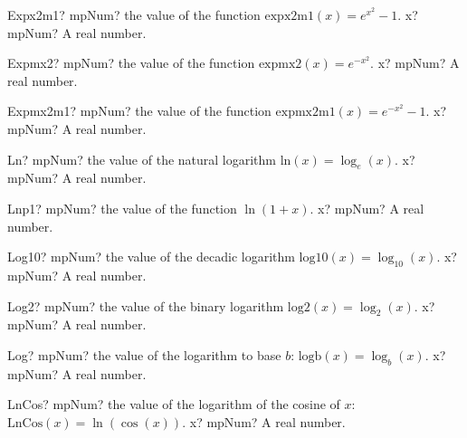 \documentclass[12pt,a4paper,openany]{book}
\begin{document}
\begin{mpFunctionsExtract}
\mpFunctionOne
{Expx2m1? mpNum? the value of the function $\text{expx2m1}(x) = e^{x^2}-1$.}
{x? mpNum? A real number.}
\end{mpFunctionsExtract}

\begin{mpFunctionsExtract}
\mpFunctionOne
{Expmx2? mpNum? the value of the function $\text{expmx2}(x) = e^{-x^2}$.}
{x? mpNum? A real number.}
\end{mpFunctionsExtract}

\begin{mpFunctionsExtract}
\mpFunctionOne
{Expmx2m1? mpNum? the value of the function $\text{expmx2m1}(x) = e^{-x^2}-1$.}
{x? mpNum? A real number.}
\end{mpFunctionsExtract}

\begin{mpFunctionsExtract}
\mpFunctionOne
{Ln? mpNum? the value of the natural logarithm $\text{ln}(x) = \log_e(x)$.}
{x? mpNum? A real number.}
\end{mpFunctionsExtract}

\begin{mpFunctionsExtract}
\mpFunctionOne
{Lnp1? mpNum? the value of the function $\ln(1+x)$.}
{x? mpNum? A real number.}
\end{mpFunctionsExtract}

\begin{mpFunctionsExtract}
\mpFunctionOne
{Log10? mpNum? the value of the decadic logarithm $\text{log10}(x) = \log_{10}(x)$.}
{x? mpNum? A real number.}
\end{mpFunctionsExtract}

\begin{mpFunctionsExtract}
\mpFunctionOne
{Log2? mpNum? the value of the binary logarithm $\text{log2}(x) = \log_{2}(x)$.}
{x? mpNum? A real number.}
\end{mpFunctionsExtract}

\begin{mpFunctionsExtract}
\mpFunctionOne
{Log? mpNum? the value of the logarithm  to base $b$: $\text{logb}(x) = \log_{b}(x)$.}
{x? mpNum? A real number.}
\end{mpFunctionsExtract}

\begin{mpFunctionsExtract}
\mpFunctionOne
{LnCos? mpNum? the value of the logarithm of the cosine of $x$: $\text{LnCos}(x) =\ln(\cos(x))$.}
{x? mpNum? A real number.}
\end{mpFunctionsExtract}
\end{document}
